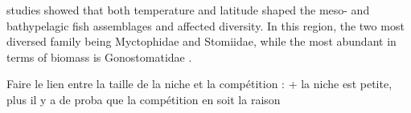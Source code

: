
\citep{garcia2021} studies showed that both temperature and latitude shaped the meso- and bathypelagic fish assemblages and affected diversity. In this region, the two most diversed family being Myctophidae and Stomiidae, while the most abundant in terms of biomass is Gonostomatidae \citep{garcia2021}.

Faire le lien entre la taille de la niche et la compétition : + la niche est petite, plus il y a de proba que la compétition en soit la raison 
